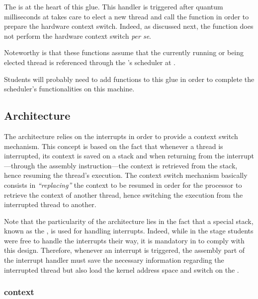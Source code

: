 The  is at the heart of this glue. This
handler is triggered after quantum milliseconds at takes care to elect
a new thread and call the  function
in order to prepare the hardware context switch. Indeed, as discussed
next, the  function does not perform
the hardware context switch \textit{per se}.

Noteworthy is that these functions assume that the currently running or
being elected thread is referenced through the 's scheduler at
.

Students will probably need to add functions to this glue in order to
complete the scheduler's functionalities on this machine.

%
%

\subsection{Architecture}

The  architecture relies on the interrupts in order
to provide a context switch mechanism. This concept is based on the fact
that whenever a thread is interrupted, its context is saved on a stack
and when returning from the interrupt---through the  assembly
instruction---the context is retrieved from the stack, hence resuming the
thread's execution. The context switch mechanism basically consists in
\textit{``replacing''} the context to be resumed in order for the processor to
retrieve the context of another thread, hence switching the execution from the
interrupted thread to another.

Note that the particularity of the  architecture lies
in the fact that a special stack, known as the , is used for handling interrupts. Indeed, while in the stage 
students were free to handle the interrupts their way, it is mandatory in
 to comply with this design. Therefore, whenever an interrupt is
triggered, the assembly part of the interrupt handler must save the necessary
information regarding the interrupted thread but also load the kernel address
space and switch on the .

\subsubsection*{context}

